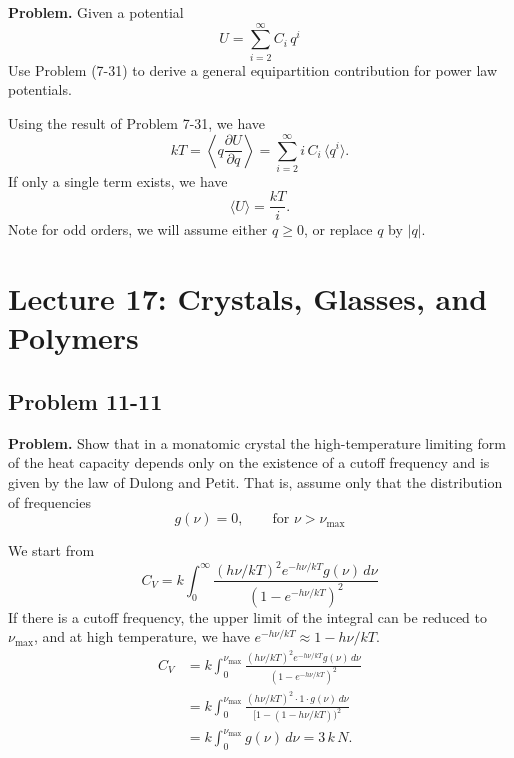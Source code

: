 \documentclass[twocolumn, 10pt]{article}
\numberwithin{equation}{section}
\newenvironment{problem}
{\par\medskip\sffamily \color{problue}
  \textbf{Problem. }\ignorespaces}
{\medskip}
\newenvironment{solution}[1][\empty]
{\par\medskip
  \textbf{\ifx\empty#1{Solution.}\relax\else{#1}\fi} \ignorespaces}
{\medskip}
\begin{document}
\begin{problem}
  Given a potential
  $$
  U = \sum_{i=2}^\infty C_i \, q^i
  $$
  Use Problem (7-31) to derive a general
  equipartition contribution for power law potentials.
\end{problem}

\begin{solution}
Using the result of Problem 7-31, we have
$$
kT
=
\left\langle
  q \frac{ \partial U } { \partial q }
\right\rangle
=
\sum_{i = 2}^\infty
  i \, C_i \, \langle q^i \rangle
.
$$
If only a single term exists, we have
$$
  \langle U \rangle = \frac{kT}{i}.
$$
Note for odd orders, we will assume either $q \ge 0$,
or replace $q$ by $|q|$.
\end{solution}

\section{Lecture 17: Crystals, Glasses, and Polymers}

\subsection{Problem 11-11}

\begin{problem}
  Show that in a monatomic crystal the high-temperature limiting form
  of the heat capacity depends only on the existence of a cutoff frequency
  and is given by the law of Dulong and Petit.
  That is, assume only that the distribution of frequencies
  $$
  g(\nu) = 0, \qquad \mbox{for $\nu > \nu_\mathrm{max}$}
  $$
\end{problem}

\begin{solution}
  We start from
  \begin{equation}
    C_V = k
    \int_0^\infty
      \frac{ (h\nu/kT)^2 e^{-h\nu/kT} g(\nu) \, d\nu }
           { (1 - e^{-h\nu/kT})^2 }
    \tag{11-10}
  \end{equation}
  If there is a cutoff frequency, the upper limit of the integral
  can be reduced to $\nu_\mathrm{max}$, and
  at high temperature,
  we have $e^{-h\nu/kT} \approx 1 - h\nu/kT$.
  \begin{align*}
    C_V
    &= k
    \int_0^{\nu_\mathrm{max}}
      \frac{ (h\nu/kT)^2 e^{-h\nu/kT} g(\nu) \, d\nu }
           { (1 - e^{-h\nu/kT})^2 }
    \\
    &= k
    \int_0^{\nu_\mathrm{max}}
      \frac{ (h\nu/kT)^2 \cdot 1 \cdot g(\nu) \, d\nu }
           { [1 - (1-h\nu/kT))^2 }
    \\
    &= k \int_0^{\nu_\mathrm{max}} g(\nu) \, d\nu
    = 3 \, k \, N.
  \end{align*}
\end{solution}
\end{document}
